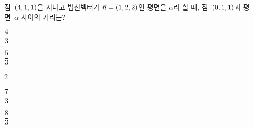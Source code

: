 점~$(4{,}\mkern3mu\mathopen{}1{,}\mkern3mu\mathopen{}1)$을 지나고 법선벡터가 $\vec{n}=(1{,}\mkern3mu\mathopen{}2{,}\mkern3mu\mathopen{}2)$인 평면을 $\alpha$라 할 때, 점~$(0{,}\mkern3mu\mathopen{}1{,}\mkern3mu\mathopen{}1)$과 평면~$\alpha$ 사이의 거리는?
\begin{choices32}{\rule[-3ex]{0pt}{8ex}$\dfrac{4}{3}$}{\rule[-3ex]{0pt}{8ex}$\dfrac{5}{3}$}{\rule[-3ex]{0pt}{8ex}$2$}{\rule[-3ex]{0pt}{8ex}$\dfrac{7}{3}$}{\rule[-3ex]{0pt}{8ex}$\dfrac{8}{3}$}\end{choices32}
